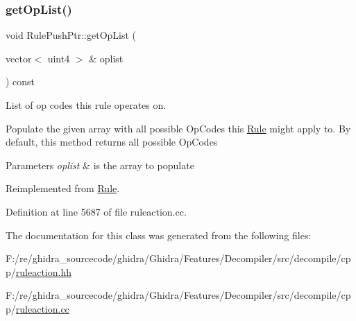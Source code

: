 \subsubsection{\texorpdfstring{getOpList()}{getOpList()}}
{\footnotesize\ttfamily void Rule\+Push\+Ptr\+::get\+Op\+List (\begin{DoxyParamCaption}\item[{vector$<$ uint4 $>$ \&}]{oplist }\end{DoxyParamCaption}) const\hspace{0.3cm}{\ttfamily [virtual]}}



List of op codes this rule operates on. 

Populate the given array with all possible Op\+Codes this \mbox{\hyperlink{class_rule}{Rule}} might apply to. By default, this method returns all possible Op\+Codes 
\begin{DoxyParams}{Parameters}
{\em oplist} & is the array to populate \\
\hline
\end{DoxyParams}


Reimplemented from \mbox{\hyperlink{class_rule_a4023bfc7825de0ab866790551856d10e}{Rule}}.



Definition at line 5687 of file ruleaction.\+cc.



The documentation for this class was generated from the following files\+:\begin{DoxyCompactItemize}
\item 
F\+:/re/ghidra\+\_\+sourcecode/ghidra/\+Ghidra/\+Features/\+Decompiler/src/decompile/cpp/\mbox{\hyperlink{ruleaction_8hh}{ruleaction.\+hh}}\item 
F\+:/re/ghidra\+\_\+sourcecode/ghidra/\+Ghidra/\+Features/\+Decompiler/src/decompile/cpp/\mbox{\hyperlink{ruleaction_8cc}{ruleaction.\+cc}}\end{DoxyCompactItemize}
